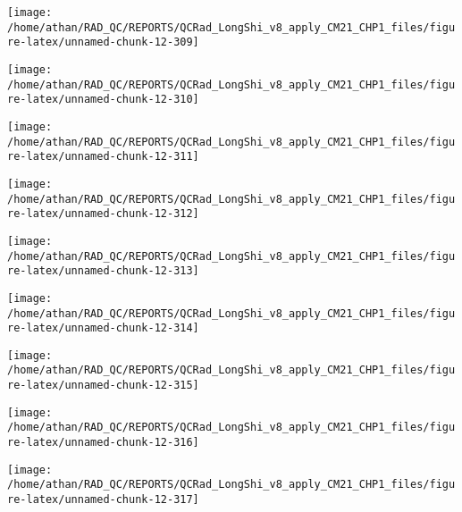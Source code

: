 \documentclass[
  10pt,
  a4paper,oneside]{article}
\begin{document}
\begin{center}\texttt{[image: /home/athan/RAD\_QC/REPORTS/QCRad\_LongShi\_v8\_apply\_CM21\_CHP1\_files/figure-latex/unnamed-chunk-12-309]} \end{center}

\begin{center}\texttt{[image: /home/athan/RAD\_QC/REPORTS/QCRad\_LongShi\_v8\_apply\_CM21\_CHP1\_files/figure-latex/unnamed-chunk-12-310]} \end{center}

\begin{center}\texttt{[image: /home/athan/RAD\_QC/REPORTS/QCRad\_LongShi\_v8\_apply\_CM21\_CHP1\_files/figure-latex/unnamed-chunk-12-311]} \end{center}

\begin{center}\texttt{[image: /home/athan/RAD\_QC/REPORTS/QCRad\_LongShi\_v8\_apply\_CM21\_CHP1\_files/figure-latex/unnamed-chunk-12-312]} \end{center}

\begin{center}\texttt{[image: /home/athan/RAD\_QC/REPORTS/QCRad\_LongShi\_v8\_apply\_CM21\_CHP1\_files/figure-latex/unnamed-chunk-12-313]} \end{center}

\begin{center}\texttt{[image: /home/athan/RAD\_QC/REPORTS/QCRad\_LongShi\_v8\_apply\_CM21\_CHP1\_files/figure-latex/unnamed-chunk-12-314]} \end{center}

\begin{center}\texttt{[image: /home/athan/RAD\_QC/REPORTS/QCRad\_LongShi\_v8\_apply\_CM21\_CHP1\_files/figure-latex/unnamed-chunk-12-315]} \end{center}

\begin{center}\texttt{[image: /home/athan/RAD\_QC/REPORTS/QCRad\_LongShi\_v8\_apply\_CM21\_CHP1\_files/figure-latex/unnamed-chunk-12-316]} \end{center}

\begin{center}\texttt{[image: /home/athan/RAD\_QC/REPORTS/QCRad\_LongShi\_v8\_apply\_CM21\_CHP1\_files/figure-latex/unnamed-chunk-12-317]} \end{center}
\end{document}
